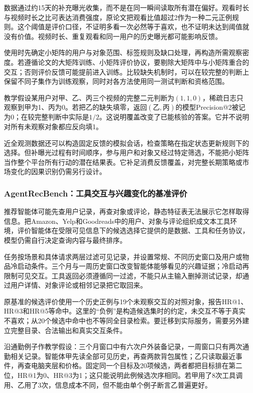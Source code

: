 数据通过约15天的补充曝光收集，而不是在同一瞬间读取所有潜在偏好。观看时长与视频时长之比可表达消费强度，原论文把观看比值超过2作为一种二元正例规则。这个阈值是评价口径，不证明多看一次必然等于喜欢，也不证明未达到阈值就没有价值。视频时长、重复观看和同一用户的历史曝光都可能影响反馈。

使用时先确定小矩阵的用户与对象范围、标签规则及缺口处理，再构造所需观察密度。若遵循论文的大矩阵训练、小矩阵评价协议，要剔除大矩阵中与小矩阵重合的交互；否则评价反馈可能提前进入训练。比较缺失机制时，可以在较完整的判断上保留不同子集作为训练观察，同时对各方法使用同一测试判断和资格范围。

教学假设某用户对甲、乙、丙三个视频的完整二元判断为$(1,1,0)$，稀疏日志只观察到甲为1、丙为0。若把乙的缺失填零，返回$(\text{乙},\text{丙})$的模型Precision@2被记为0；在较完整判断中实际是$1/2$。这说明覆盖改变了已能核验的答案。它并不说明对所有未观察对象都应反向填1。

近全观测数据还可以构造固定反馈的模拟会话，检查策略在指定状态更新规则下的选择。但补曝光过程有时间顺序，参与用户和对象又经过特定筛选，不能把小矩阵当作整个平台所有行动的潜在结果表。它补足消费反馈覆盖，对完整长期策略或市场变化的因果识别仍需另行设计。

\Needspace{110mm}
\subsubsection{AgentRecBench：工具交互与兴趣变化的基准评价}
\label{sec:rs-evaluation-agentrecbench}

推荐智能体可能先查用户记录，再查对象或评论，静态特征表无法展示它怎样取得信息。把Amazon、Yelp和Goodreads中的用户、对象与评论组织成文本工具环境，评价智能体在受限可见信息下的候选选择它提供的是数据、工具和任务协议，模型仍需自行决定查询内容与最终排序。

任务按场景和具体请求两层过滤可见记录，并设置常规、不同历史窗口及用户或物品冷启动条件。三个月与一周历史窗口改变智能体能够看见的兴趣证据；冷启动再限制可见交互。工具返回必须遵循同一过滤，不能只从主输入删掉测试记录，却通过用户详情、对象评论或相邻记录把它取回来。

原基准的候选评价使用一个历史正例与19个未观察交互的对照对象，报告HR@1、HR@3和HR@5等命中。这里的“负例”是构造候选集时的约定，未交互不等于真实不喜欢；从20个候选中命中也不等同全目录检索。要迁移到实际服务，需要另外建立完整目录、合法输出和真实交互条件。

沿通勤例子作教学假设：三个月窗口中有六次户外装备记录，一周窗口只有两次通勤相关记录。智能体甲先读全部可见历史，再查两款背包属性；乙只读取最近事件，再查电脑夹层和价格。固定同一个目标及20项候选，两者都把目标排在第二位，HR@1为0、HR@3为1；这只能说明此例候选次序相同。若甲用了8次工具调用、乙用了3次，信息成本不同，但不能由单个例子断言乙普遍更好。

